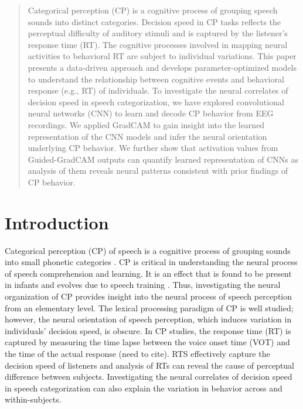 \documentclass{article}
\begin{document}
\printAffiliationsAndNotice{\icmlEqualContribution} %

\begin{abstract}
Categorical perception (CP) is a cognitive process of grouping speech sounds into distinct categories.
Decision speed in CP tasks reflects the perceptual difficulty of auditory stimuli and is captured by
the listener's response time (RT). The cognitive processes involved in mapping neural activities
to behavioral RT are subject to individual variations. This paper presents a data-driven approach
and develops parameter-optimized models to understand the relationship between cognitive events
and behavioral response (e.g., RT) of individuals. To investigate the neural correlates of
decision speed in speech categorization, we have explored convolutional neural networks (CNN) to
learn and decode CP behavior from EEG recordings. We applied GradCAM to gain insight into the
learned representation of the CNN models and infer the neural orientation underlying CP behavior.
We further show that activation values from Guided-GradCAM outputs can quantify learned representation
of CNNs as analysis of them reveals neural patterns consistent with prior findings of CP behavior.
\end{abstract}

\section{Introduction}
\label{submission}

Categorical perception (CP) of speech is a cognitive process of grouping sounds into small phonetic categories \cite{cp}. CP is critical in understanding the neural process of speech comprehension and learning. It is an effect that is found to be present in infants and evolves due to speech training \cite{infant_cp}. Thus, investigating the neural organization of CP provides insight into the neural process of speech perception from an elementary level. The lexical processing paradigm of CP is well studied; however, the neural orientation of speech perception, which induces variation in individuals' decision speed, is obscure. In CP studies, the response time (RT) is captured by measuring the time lapse between the voice onset time (VOT) and the time of the actual response (need to cite). RTS effectively capture the decision speed of listeners \cite{decisionspeed} and analysis of RTs can reveal the cause of perceptual difference between subjects. Investigating the neural correlates of decision speed in speech categorization can also explain the variation in behavior across and within-subjects.
\end{document}
